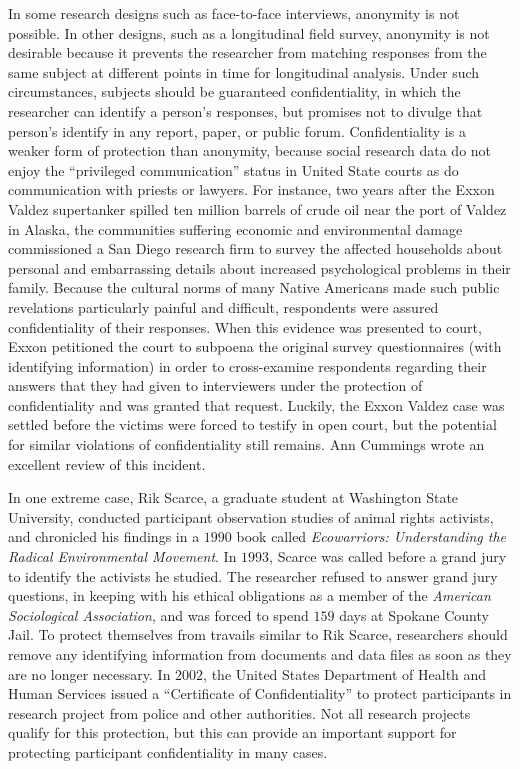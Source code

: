In some research designs such as face-to-face interviews, anonymity is not possible. In other designs, such as a longitudinal field survey, anonymity is not desirable because it prevents the researcher from matching responses from the same subject at different points in time for longitudinal analysis. Under such circumstances, subjects should be guaranteed confidentiality, in which the researcher can identify a person's responses, but promises not to divulge that person's identify in any report, paper, or public forum. Confidentiality is a weaker form of protection than anonymity, because social research data do not enjoy the ``privileged communication'' status in United State courts as do communication with priests or lawyers. For instance, two years after the Exxon Valdez supertanker spilled ten million barrels of crude oil near the port of Valdez in Alaska, the communities suffering economic and environmental damage commissioned a San Diego research firm to survey the affected households about personal and embarrassing details about increased psychological problems in their family. Because the cultural norms of many Native Americans made such public revelations particularly painful and difficult, respondents were assured confidentiality of their responses. When this evidence was presented to court, Exxon petitioned the court to subpoena the original survey questionnaires (with identifying information) in order to cross-examine respondents regarding their answers that they had given to interviewers under the protection of confidentiality and was granted that request. Luckily, the Exxon Valdez case was settled before the victims were forced to testify in open court, but the potential for similar violations of confidentiality still remains. Ann Cummings\cite{cummings1992exxon} wrote an excellent review of this incident.

In one extreme case, Rik Scarce, a graduate student at Washington State University, conducted participant observation studies of animal rights activists, and chronicled his findings in a $ 1990 $ book called \textit{Ecowarriors: Understanding the Radical Environmental Movement}. In $ 1993 $, Scarce was called before a grand jury to identify the activists he studied. The researcher refused to answer grand jury questions, in keeping with his ethical obligations as a member of the \textit{American Sociological Association}, and was forced to spend $ 159 $ days at Spokane County Jail. To protect themselves from travails similar to Rik Scarce, researchers should remove any identifying information from documents and data files as soon as they are no longer necessary. In $ 2002 $, the United States Department of Health and Human Services issued a ``Certificate of Confidentiality'' to protect participants in research project from police and other authorities. Not all research projects qualify for this protection, but this can provide an important support for protecting participant confidentiality in many cases.

